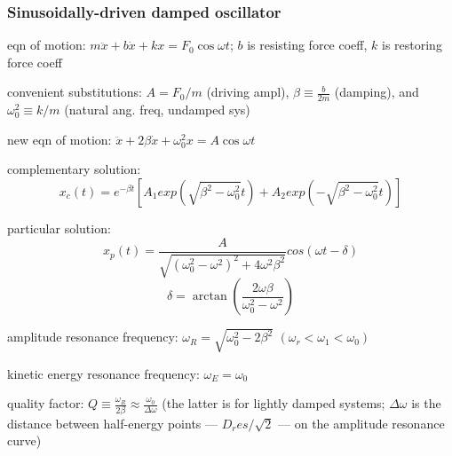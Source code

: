 \documentclass[letterpaper,landscape,10pt]{article}
\newenvironment{mydescription}
{\begin{description}
	\setlength{\itemsep}{0pt}
	\setlength{\parskip}{0pt}
	\setlength{\parsep}{-1pt}}
{\end{description}}
\begin{document}
{\begin{multicols}{3}
	\subsubsection*{Sinusoidally-driven damped oscillator}
		\begin{mydescription}
			\item[eqn of motion:]
				$m\ddot{x} + b\dot{x} + kx = F_0\cos\omega t$;
				$b$ is resisting force coeff, $k$ is restoring force coeff  \\
			\item[convenient substitutions:]
				$A=F_0/m$ (driving ampl), $\beta \equiv \frac{b}{2m}$
				(damping), and $\omega_0^2 \equiv k/m$ (natural ang. freq,
				undamped sys)  \\
			\item[new eqn of motion:]
				$\ddot{x} + 2\beta\dot{x} + \omega_0^2x = A\cos\omega t$  \\
			\item[complementary solution:]
				$$
					x_c(t) = e^{-\beta t}\left[ A_1exp\left(
					\sqrt{\beta^2-\omega_0^2}t\right) + A_2exp\left(
					-\sqrt{\beta^2-\omega_0^2}t\right) \right]
				$$
			\item[particular solution:]
				$$
					x_p(t)=\frac{A}{\sqrt{\left(
					\omega_0^2-\omega^2\right)^2+4\omega^2\beta^2}} cos(\omega
					t-\delta)
				$$
				$$
					\delta = \arctan\left( \frac{2\omega\beta}{\omega_0^2 -
					\omega^2} \right)
				$$
			\item[amplitude resonance frequency:]
				$\omega_R = \sqrt{\omega_0^2-2\beta^2} \,\, (\omega_r <
				\omega_1 < \omega_0)$ \\
			\item[kinetic energy resonance frequency:]
				$\omega_E = \omega_0$ \\
			\item[quality factor:]
				$Q \equiv \frac{\omega_R}{2\beta} \approx
				\frac{\omega_0}{\Delta\omega}$ (the latter is for lightly
				damped systems; $\Delta\omega$ is the distance between
				half-energy points --- $D_res/\sqrt{2}$ --- on the amplitude
				resonance curve) \\
		\end{mydescription}
	

\end{multicols}}
\end{document}
